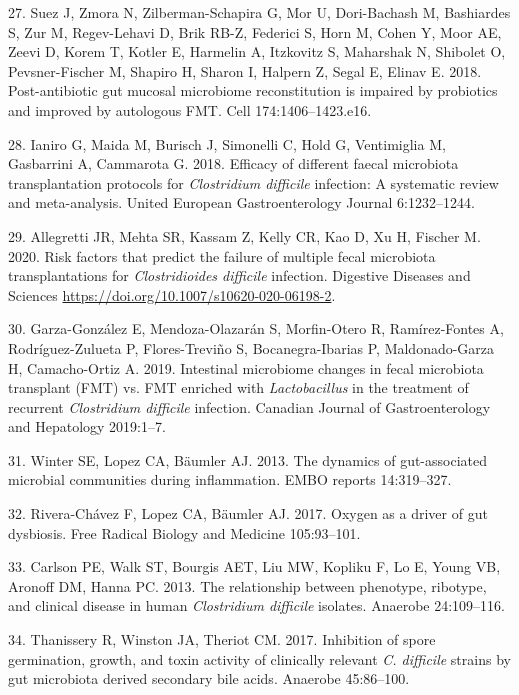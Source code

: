 \documentclass[12pt,]{article}
\newlength{\cslhangindent}
\newenvironment{cslreferences}%
  {\setlength{\parindent}{0pt}%
  \everypar{\setlength{\hangindent}{\cslhangindent}}\ignorespaces}%
  {\par}
\begin{document}
\begin{cslreferences}
\leavevmode\hypertarget{ref-suez2018}{}%
27. Suez J, Zmora N, Zilberman-Schapira G, Mor U, Dori-Bachash M,
Bashiardes S, Zur M, Regev-Lehavi D, Brik RB-Z, Federici S, Horn M,
Cohen Y, Moor AE, Zeevi D, Korem T, Kotler E, Harmelin A, Itzkovitz S,
Maharshak N, Shibolet O, Pevsner-Fischer M, Shapiro H, Sharon I, Halpern
Z, Segal E, Elinav E. 2018. Post-antibiotic gut mucosal microbiome
reconstitution is impaired by probiotics and improved by autologous FMT.
Cell 174:1406--1423.e16.

\leavevmode\hypertarget{ref-ianiro2018}{}%
28. Ianiro G, Maida M, Burisch J, Simonelli C, Hold G, Ventimiglia M,
Gasbarrini A, Cammarota G. 2018. Efficacy of different faecal microbiota
transplantation protocols for \emph{Clostridium difficile} infection: A
systematic review and meta-analysis. United European Gastroenterology
Journal 6:1232--1244.

\leavevmode\hypertarget{ref-allegretti2020}{}%
29. Allegretti JR, Mehta SR, Kassam Z, Kelly CR, Kao D, Xu H, Fischer M.
2020. Risk factors that predict the failure of multiple fecal microbiota
transplantations for \emph{Clostridioides difficile} infection.
Digestive Diseases and Sciences
\url{https://doi.org/10.1007/s10620-020-06198-2}.

\leavevmode\hypertarget{ref-garzagonzlez2019}{}%
30. Garza-González E, Mendoza-Olazarán S, Morfin-Otero R, Ramírez-Fontes
A, Rodríguez-Zulueta P, Flores-Treviño S, Bocanegra-Ibarias P,
Maldonado-Garza H, Camacho-Ortiz A. 2019. Intestinal microbiome changes
in fecal microbiota transplant (FMT) vs. FMT enriched with
\emph{Lactobacillus} in the treatment of recurrent \emph{Clostridium
difficile} infection. Canadian Journal of Gastroenterology and
Hepatology 2019:1--7.

\leavevmode\hypertarget{ref-winter2013}{}%
31. Winter SE, Lopez CA, Bäumler AJ. 2013. The dynamics of
gut-associated microbial communities during inflammation. EMBO reports
14:319--327.

\leavevmode\hypertarget{ref-riverachavez2017}{}%
32. Rivera-Chávez F, Lopez CA, Bäumler AJ. 2017. Oxygen as a driver of
gut dysbiosis. Free Radical Biology and Medicine 105:93--101.

\leavevmode\hypertarget{ref-carlson2013}{}%
33. Carlson PE, Walk ST, Bourgis AET, Liu MW, Kopliku F, Lo E, Young VB,
Aronoff DM, Hanna PC. 2013. The relationship between phenotype,
ribotype, and clinical disease in human \emph{Clostridium difficile}
isolates. Anaerobe 24:109--116.

\leavevmode\hypertarget{ref-thanissery2017}{}%
34. Thanissery R, Winston JA, Theriot CM. 2017. Inhibition of spore
germination, growth, and toxin activity of clinically relevant \emph{C.
difficile} strains by gut microbiota derived secondary bile acids.
Anaerobe 45:86--100.


\end{cslreferences}
\end{document}

